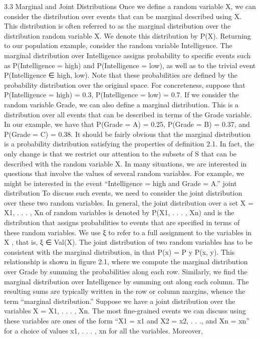 3.3 Marginal and Joint Distributions
Once we define a random variable X, we can consider the distribution over events that can be marginal described using X. This distribution is often referred to as the marginal distribution over the distribution random variable X. We denote this distribution by P(X). Returning to our population example, consider the random variable Intelligence. The marginal distribution over Intelligence assigns probability to specific events such as P(Intelligence = high) and P(Intelligence = low), as well as to the trivial event P(Intelligence ∈ {high, low}). Note that these probabilities are defined by the probability distribution over the original space. For concreteness, suppose that P(Intelligence = high) = 0.3, P(Intelligence = low) = 0.7. If we consider the random variable Grade, we can also define a marginal distribution. This is a distribution over all events that can be described in terms of the Grade variable. In our example, we have that P(Grade = A) = 0.25, P(Grade = B) = 0.37, and P(Grade = C) = 0.38. It should be fairly obvious that the marginal distribution is a probability distribution satisfying the properties of definition 2.1. In fact, the only change is that we restrict our attention to the subsets of S that can be described with the random variable X. In many situations, we are interested in questions that involve the values of several random variables. For example, we might be interested in the event “Intelligence = high and Grade = A.” joint distribution To discuss such events, we need to consider the joint distribution over these two random variables. In general, the joint distribution over a set X = {X1, . . . , Xn} of random variables is denoted by P(X1, . . . , Xn) and is the distribution that assigns probabilities to events that are specified in terms of these random variables. We use ξ to refer to a full assignment to the variables in X , that is, ξ ∈ Val(X). The joint distribution of two random variables has to be consistent with the marginal distribution, in that P(x) = P y P(x, y). This relationship is shown in figure 2.1, where we compute the marginal distribution over Grade by summing the probabilities along each row. Similarly, we find the marginal distribution over Intelligence by summing out along each column. The resulting sums are typically written in the row or column margins, whence the term “marginal distribution.” Suppose we have a joint distribution over the variables X = {X1, . . . , Xn}. The most fine-grained events we can discuss using these variables are ones of the form “X1 = x1 and X2 = x2, . . ., and Xn = xn” for a choice of values x1, . . . , xn for all the variables. Moreover,

